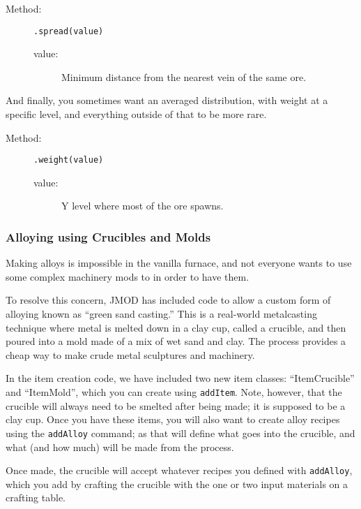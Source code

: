 \documentclass[letterpaper,titlepage,12pt]{article}
\begin{document}
\begin{description}
\item[Method:] \texttt{.spread(value)}
\begin{description}
\item [value:] Minimum distance from the nearest vein of the same ore.
\end{description}
\end{description}

And finally, you sometimes want an averaged distribution, with weight at a specific level, and everything outside of that to be more rare.

\begin{description}
\item[Method:] \texttt{.weight(value)}
\begin{description}
\item [value:] Y level where most of the ore spawns.
\end{description}
\end{description}

\subsubsection{Alloying using Crucibles and Molds}

Making alloys is impossible in the vanilla furnace, and not everyone wants to use some complex machinery mods to in order to have them.

To resolve this concern, JMOD has included code to allow a custom form of alloying known as ``green sand casting.''  This is a real-world metalcasting technique where metal is melted down in a clay cup, called a crucible, and then poured into a mold made of a mix of wet sand and clay.  The process provides a cheap way to make crude metal sculptures and machinery.

In the item creation code, we have included two new item classes: ``ItemCrucible'' and ``ItemMold'', which you can create using \texttt{addItem}.  Note, however, that the crucible will always need to be smelted after being made; it is supposed to be a clay cup.  Once you have these items, you will also want to create alloy recipes using the \texttt{addAlloy} command; as that will define what goes into the crucible, and what (and how much) will be made from the process.

Once made, the crucible will accept whatever recipes you defined with \texttt{addAlloy}, which you add by crafting the crucible with the one or two input materials on a crafting table.
\end{document}
